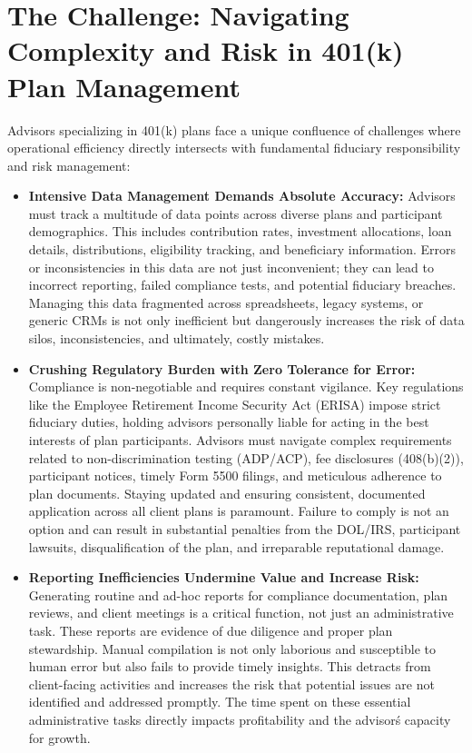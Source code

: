 \documentclass[11pt]{article} %
\begin{document}
\section{The Challenge: Navigating Complexity and Risk in 401(k) Plan Management}
Advisors specializing in 401(k) plans face a unique confluence of challenges where operational efficiency directly intersects with fundamental fiduciary responsibility and risk management:
\begin{itemize}[leftmargin=*]
    \item \textbf{Intensive Data Management Demands Absolute Accuracy:} Advisors must track a multitude of data points across diverse plans and participant demographics. This includes contribution rates, investment allocations, loan details, distributions, eligibility tracking, and beneficiary information. Errors or inconsistencies in this data are not just inconvenient; they can lead to incorrect reporting, failed compliance tests, and potential fiduciary breaches. Managing this data fragmented across spreadsheets, legacy systems, or generic CRMs is not only inefficient but dangerously increases the risk of data silos, inconsistencies, and ultimately, costly mistakes.
    \item \textbf{Crushing Regulatory Burden with Zero Tolerance for Error:} Compliance is non-negotiable and requires constant vigilance. Key regulations like the Employee Retirement Income Security Act (ERISA) impose strict fiduciary duties, holding advisors personally liable for acting in the best interests of plan participants. Advisors must navigate complex requirements related to non-discrimination testing (ADP/ACP), fee disclosures (408(b)(2)), participant notices, timely Form 5500 filings, and meticulous adherence to plan documents. Staying updated and ensuring consistent, documented application across all client plans is paramount. Failure to comply is not an option and can result in substantial penalties from the DOL/IRS, participant lawsuits, disqualification of the plan, and irreparable reputational damage.
    \item \textbf{Reporting Inefficiencies Undermine Value and Increase Risk:} Generating routine and ad-hoc reports for compliance documentation, plan reviews, and client meetings is a critical function, not just an administrative task. These reports are evidence of due diligence and proper plan stewardship. Manual compilation is not only laborious and susceptible to human error but also fails to provide timely insights. This detracts from client-facing activities and increases the risk that potential issues are not identified and addressed promptly. The time spent on these essential administrative tasks directly impacts profitability and the advisor\'s capacity for growth.

\end{itemize}
\end{document}
